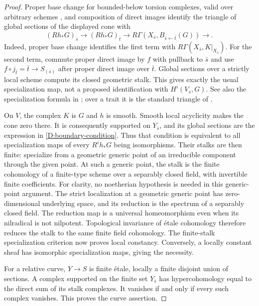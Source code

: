 \begin{proof}
Proper base change for bounded-below torsion complexes, valid over
arbitrary schemes \cite[Lemma 59.91.12, tag 0DDE]{StacksDGeneral},
and composition of direct images identify the
triangle of global sections of the displayed cone with
\[
 (Rh_*G)_{\bar s}\longrightarrow (Rh_*G)_{\bar t}
 \longrightarrow R\Gamma(X_{\bar s},B_{\bar s\leftarrow\bar t}(G))
 \longrightarrow.
\]
Indeed, proper base change identifies the first term with
$R\Gamma(X_{\bar s},K|_{X_{\bar s}})$. For the second term,
commute proper direct image by $f$ with pullback to $\bar s$
and use $f\circ j_{\bar t}=\bar t\to S_{(\bar s)}$ after
proper direct image over $\bar t$. Global sections over a strictly
local scheme compute its closed geometric stalk. This gives exactly
the usual specialization map, not a proposed identification with
$H^i(V_{\bar s},G)$. See also the specialization formula in
\cite[Lemma 59.75.7]{StacksSpecialization}; over a trait it is the
standard triangle of \cite[XIII, (2.1.8.9)]{SGA7II}.

On $V$, the complex $K$ is $G$ and $h$ is smooth. Smooth local
acyclicity makes the cone zero there. It is consequently supported
on $Y_{\bar s}$, and its global sections are the expression in
\eqref{D:boundary-condition}. Thus that condition is equivalent to
all specialization maps of every $R^i h_*G$ being isomorphisms.
Their stalks are then finite: specialize from a geometric generic
point of an irreducible component through the given point. At such
a generic point, the stalk is the finite cohomology of a finite-type
scheme over a separably closed field, with invertible finite
coefficients. For clarity, no noetherian hypothesis is needed in this
generic-point argument. The strict localization at a geometric generic
point has zero-dimensional underlying space, and its reduction is the
spectrum of a separably closed field. The reduction map is a universal
homeomorphism even when its nilradical is not nilpotent. Topological
invariance of \'etale cohomology
\cite[Proposition 59.45.4, tag 03SI]{StacksDGeneral} therefore reduces
the stalk to the same finite field cohomology.
The finite-stalk specialization criterion
\cite[Lemmas 59.75.5--6]{StacksSpecialization} now proves local
constancy. Conversely, a locally constant sheaf has isomorphic
specialization maps, giving the necessity.

For a relative curve, $Y\to S$ is finite \'etale, locally a
finite disjoint union of sections. A complex supported on the finite
set $Y_{\bar s}$ has hypercohomology equal to the direct sum of
its stalk complexes. It vanishes if and only if every such complex
vanishes. This proves the curve assertion.
\end{proof}


